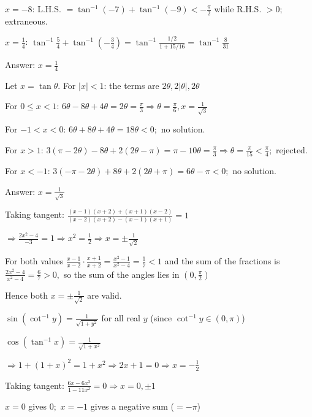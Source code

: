   $x = -8$: L.H.S. $= \tan^{-1}(-7) + \tan^{-1}(-9) < -\frac{\pi}{2}$ while R.H.S. $> 0;$ extraneous.

  $x = \frac{1}{4}$: $\tan^{-1}\frac{5}{4} + \tan^{-1}\left(-\frac{3}{4}\right) = \tan^{-1}\frac{1/2}{1 + 15/16} =
  \tan^{-1}\frac{8}{31}$

  Answer: $x = \frac{1}{4}$

\item Let $x = \tan\theta.$ For $|x| < 1$: the terms are $2\theta, 2|\theta|, 2\theta$

  For $0\leq x < 1$: $6\theta - 8\theta + 4\theta = 2\theta = \frac{\pi}{3} \Rightarrow \theta = \frac{\pi}{6}, x =
  \frac{1}{\sqrt{3}}$

  For $-1 < x < 0$: $6\theta + 8\theta + 4\theta = 18\theta < 0;$ no solution.

  For $x > 1$: $3(\pi - 2\theta) - 8\theta + 2(2\theta - \pi) = \pi - 10\theta = \frac{\pi}{3} \Rightarrow \theta =
  \frac{\pi}{15} < \frac{\pi}{4};$ rejected.

  For $x < -1$: $3(-\pi - 2\theta) + 8\theta + 2(2\theta + \pi) = 6\theta - \pi < 0;$ no solution.

  Answer: $x = \frac{1}{\sqrt{3}}$

\item Taking tangent: $\frac{(x - 1)(x + 2) + (x + 1)(x - 2)}{(x - 2)(x + 2) - (x - 1)(x + 1)} = 1$

  $\Rightarrow \frac{2x^2 - 4}{-3} = 1 \Rightarrow x^2 = \frac{1}{2} \Rightarrow x = \pm\frac{1}{\sqrt{2}}$

  For both values $\frac{x - 1}{x - 2}\cdot\frac{x + 1}{x + 2} = \frac{x^2 - 1}{x^2 - 4} = \frac{1}{7} < 1$ and the sum of the
  fractions is $\frac{2x^2 - 4}{x^2 - 4} = \frac{6}{7} > 0,$ so the sum of the angles lies in $\left(0, \frac{\pi}{2}\right)$

  Hence both $x = \pm\frac{1}{\sqrt{2}}$ are valid.

\item $\sin(\cot^{-1}y) = \frac{1}{\sqrt{1 + y^2}}$ for all real $y$ (since $\cot^{-1}y\in(0, \pi)$)

  $\cos(\tan^{-1}x) = \frac{1}{\sqrt{1 + x^2}}$

  $\Rightarrow 1 + (1 + x)^2 = 1 + x^2 \Rightarrow 2x + 1 = 0 \Rightarrow x = -\frac{1}{2}$

\item Taking tangent: $\frac{6x - 6x^3}{1 - 11x^2} = 0 \Rightarrow x = 0, \pm1$

  $x = 0$ gives $0;$ $x = -1$ gives a negative sum ($= -\pi$)

